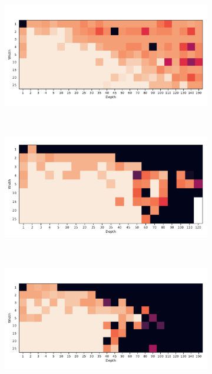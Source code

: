 \begin{figure}
\begin{subfigure}[b]{0.3\textwidth}
        \caption{\SepUnitPoint}
        \label{fig:moons_grid_up}
    \end{subfigure}
    ~ %
    \\
    \begin{subfigure}[b]{0.3\textwidth}
        \includegraphics[width=\textwidth]{img/moons_grid/acc-sep-u-0-0001.pdf}
        \caption{\SepUnit}
        \label{fig:moons_grid_u}
    \end{subfigure}
    ~ %
    \centering
    \begin{subfigure}[b]{0.3\textwidth}
        \includegraphics[width=\textwidth]{img/moons_grid/acc-sep-p-0-0001.pdf}
        \caption{\SepPoint}
        \label{fig:moons_grid_p}
    \end{subfigure}
    ~ %
    \centering
    \begin{subfigure}[b]{0.3\textwidth}
        \includegraphics[width=\textwidth]{img/moons_grid/acc-sep-l-0-0001.pdf}

\end{subfigure}
\end{figure}
